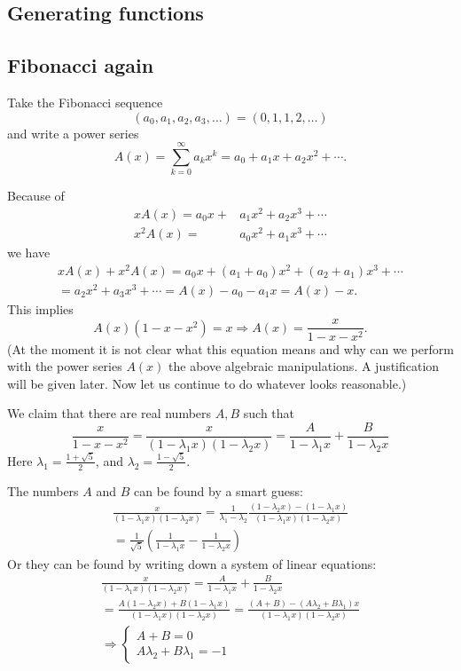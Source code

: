 \begin{page}

\section{Generating functions}

\subsection{Fibonacci again}
\label{sec:FibAgain}
Take the Fibonacci sequence
\[
(a_0, a_1, a_2, a_3, \ldots) = (0, 1, 1, 2, \ldots)
\]
and write a power series
\[
A(x) = \sum_{k=0}^\infty a_k x^k = a_0 + a_1 x + a_2 x^2 + \cdots.
\]

Because of
\begin{align*}
xA(x)  = a_0x + & a_1x^2 + a_2x^3 + \cdots\\
x^2A(x)  = & a_0x^2 + a_1x^3 + \cdots
\end{align*}
we have
\begin{multline*}
xA(x) + x^2A(x) = a_0 x + (a_1+a_0)x^2 + (a_2+a_1)x^3 + \cdots\\
= a_2x^2 + a_3x^3 + \cdots = A(x) - a_0 - a_1 x = A(x) - x.
\end{multline*}
This implies
\[
A(x)(1-x-x^2) = x \Rightarrow A(x) = \frac{x}{1-x-x^2}.
\]
(At the moment it is not clear what this equation means and why can we perform with the power series $A(x)$ the above algebraic manipulations.
A justification will be given later. Now let us continue to do whatever looks reasonable.)

We claim that there are real numbers $A, B$ such that
\[
\frac{x}{1-x-x^2} = \frac{x}{(1-\lambda_1x)(1-\lambda_2x)} = \frac{A}{1-\lambda_1x} + \frac{B}{1-\lambda_2x}
\]
Here $\lambda_1 = \frac{1+\sqrt{5}}2$, and $\lambda_2 = \frac{1-\sqrt{5}}2$.

The numbers $A$ and $B$ can be found by a smart guess:
\begin{multline*}
\frac{x}{(1-\lambda_1x)(1-\lambda_2x)} =
\frac{1}{\lambda_1 - \lambda_2} \frac{(1-\lambda_2x) - (1-\lambda_1x)}{(1-\lambda_1x)(1-\lambda_2x)}\\
= \frac{1}{\sqrt{5}} \left( \frac{1}{1-\lambda_1x} - \frac{1}{1-\lambda_2x} \right)
\end{multline*}
Or they can be found by writing down a system of linear equations:
\begin{multline*}
\frac{x}{(1-\lambda_1x)(1-\lambda_2x)} = \frac{A}{1-\lambda_1x} + \frac{B}{1-\lambda_2x}\\
= \frac{A(1-\lambda_2x) + B(1-\lambda_1x)}{(1-\lambda_1x)(1-\lambda_2x)}
= \frac{(A+B) - (A\lambda_2 + B\lambda_1)x}{(1-\lambda_1x)(1-\lambda_2x)}\\
\Rightarrow \begin{cases} A+B = 0\\ A\lambda_2 + B\lambda_1 = -1 \end{cases}
\end{multline*}


\end{page}
